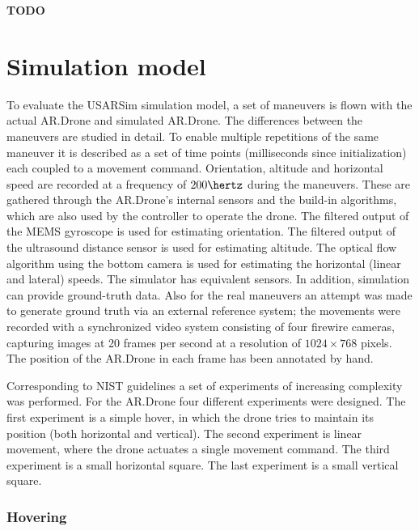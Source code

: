 \textbf{TODO}

	\section{Simulation model}
\label{sec:simulation_results}
To evaluate the USARSim simulation model,  
a set of maneuvers is flown with the actual AR.Drone and
simulated AR.Drone. The differences between the maneuvers are studied in detail. To enable multiple repetitions of the same maneuver it is
described as a set of time points (milliseconds since initialization) each coupled to a movement command.
Orientation, altitude and horizontal speed are recorded at a frequency of $200\hertz$ during the maneuvers. These are gathered through the AR.Drone's internal sensors and the build-in algorithms, which are
also used by the controller to operate the drone. The filtered output of the MEMS gyroscope is used
for estimating orientation. The filtered output of the ultrasound distance sensor is used for estimating
altitude. The optical 
flow algorithm using the bottom camera is used for estimating the horizontal (linear
and lateral) speeds. The simulator has equivalent sensors. In addition, simulation can provide ground-truth data. 
Also for the real maneuvers an attempt was made to generate ground truth via an external reference system; the movements were recorded with a synchronized video system consisting of four firewire cameras, capturing images at 20 frames per second at a resolution of $1024 \times 768$ pixels. The position of the AR.Drone 
in each frame has been annotated by hand. 

Corresponding to NIST guidelines \cite{Jacoff2010STM}
a set of experiments of increasing complexity was performed. For the AR.Drone
four different experiments were designed.
The first experiment is a simple hover, in which the drone tries to maintain its position (both horizontal and vertical). The second experiment is linear movement, where the drone actuates a single movement command. The third experiment is a small horizontal square. The last experiment is a small vertical square.

\subsubsection{Hovering}

